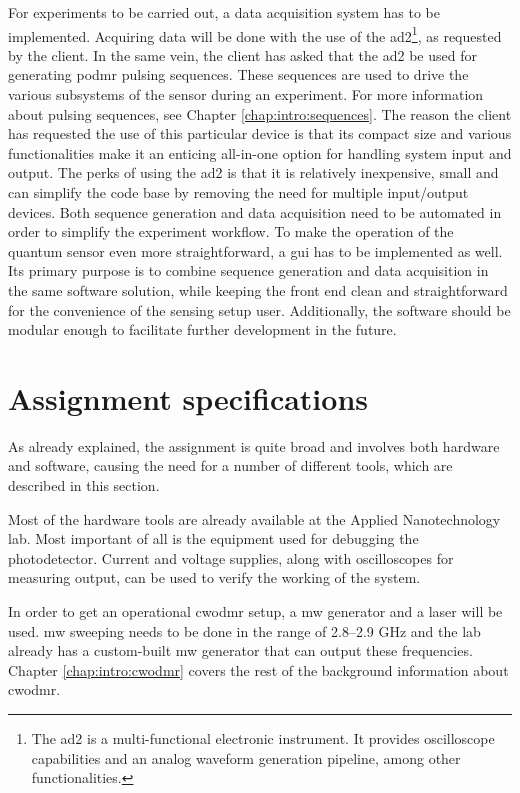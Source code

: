 For experiments to be carried out, a data acquisition system has to be implemented. Acquiring data will be done with the use of the \gls{ad2}\footnote{The \gls{ad2} is a multi-functional electronic instrument. It provides oscilloscope capabilities and an analog waveform generation pipeline, among other functionalities.}, as requested by the client. In the same vein, the client has asked that the \gls{ad2} be used for generating \gls{podmr} pulsing sequences. These sequences are used to drive the various subsystems of the sensor during an experiment. For more information about pulsing sequences, see Chapter \ref{chap:intro:sequences}. The reason the client has requested the use of this particular device is that its compact size and various functionalities make it an enticing all-in-one option for handling system input and output. The perks of using the \gls{ad2} is that it is relatively inexpensive, small and can simplify the code base by removing the need for multiple input/output devices. Both sequence generation and data acquisition need to be automated in order to simplify the experiment workflow. To make the operation of the quantum sensor even more straightforward, a \gls{gui} has to be implemented as well. Its primary purpose is to combine sequence generation and data acquisition in the same software solution, while keeping the front end clean and straightforward for the convenience of the sensing setup user. Additionally, the software should be modular enough to facilitate further development in the future.


\section{Assignment specifications}\label{specifications}
As already explained, the assignment is quite broad and involves both hardware and software, causing the need for a number of different tools, which are described in this section.

Most of the hardware tools are already available at the Applied Nanotechnology lab. Most important of all is the equipment used for debugging the photodetector. Current and voltage supplies, along with oscilloscopes for measuring output, can be used to verify the working of the system.

In order to get an operational \gls{cwodmr} setup, a \gls{mw} generator and a laser will be used. \gls{mw} sweeping needs to be done in the range of \numrange{2,8}{2,9} \unit{\giga\hertz} and the lab already has a custom-built \gls{mw} generator that can output these frequencies. Chapter \ref{chap:intro:cwodmr} covers the rest of the background information about \gls{cwodmr}.

